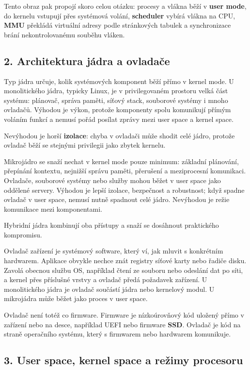 \documentclass[11pt,a4paper]{article}
\begin{document}
Tento obraz pak propojí skoro celou otázku: procesy a vlákna běží v \textbf{user mode}, do kernelu vstupují přes systémová volání, \textbf{scheduler} vybírá vlákna na CPU, \textbf{MMU} překládá virtuální adresy podle stránkových tabulek a synchronizace brání nekontrolovanému souběhu vláken.

\subsection*{2. Architektura jádra a ovladače}

Typ jádra určuje, kolik systémových komponent běží přímo v kernel mode. U monolitického jádra, typicky Linux, je v privilegovaném prostoru velká část systému: plánovač, správa paměti, síťový stack, souborové systémy i mnoho ovladačů. Výhodou je výkon, protože komponenty spolu komunikují přímým voláním funkcí a nemusí pořád posílat zprávy mezi user space a kernel space.

Nevýhodou je horší \textbf{izolace}: chyba v ovladači může shodit celé jádro, protože ovladač běží se stejnými privilegii jako zbytek kernelu.

Mikrojádro se snaží nechat v kernel mode pouze minimum: základní plánování, přepínání kontextu, nejnižší správu paměti, přerušení a meziprocesní komunikaci. Ovladače, souborové systémy nebo služby mohou běžet v user space jako oddělené servery. Výhodou je lepší izolace, bezpečnost a robustnost; když spadne ovladač v user space, nemusí nutně spadnout celé jádro. Nevýhodou je režie komunikace mezi komponentami.

Hybridní jádra kombinují oba přístupy a snaží se dosáhnout praktického kompromisu.

Ovladač zařízení je systémový software, který ví, jak mluvit s konkrétním hardwarem. Aplikace obvykle nechce znát registry síťové karty nebo řadiče disku. Zavolá obecnou službu OS, například čtení ze souboru nebo odeslání dat po síti, a kernel přes příslušné vrstvy a ovladač předá požadavek zařízení. U monolitického jádra je ovladač součástí jádra nebo kernelový modul. U mikrojádra může běžet jako proces v user space.

Ovladač není totéž co firmware. Firmware je nízkoúrovňový kód uložený přímo v zařízení nebo na desce, například UEFI nebo firmware \textbf{SSD}. Ovladač je kód na straně operačního systému, který s firmwarem nebo hardwarem komunikuje.

\subsection*{3. User space, kernel space a režimy procesoru}
\end{document}
